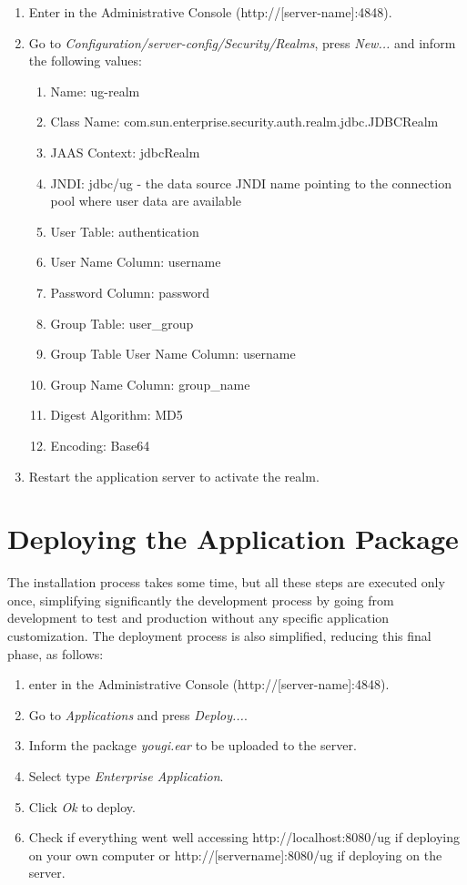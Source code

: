 \documentclass[envcountsame,envcountchap,letterpaper]{svmono}
\begin{document}
\begin{enumerate}
\item Enter in the Administrative Console (http://[server-name]:4848).
\item Go to \textit{Configuration/server-config/Security/Realms}, press \textit{New...} and inform the following values:
   \begin{enumerate}
   \item Name: ug-realm
   \item Class Name: com.sun.enterprise.security.auth.realm.jdbc.JDBCRealm
   \item JAAS Context: jdbcRealm
   \item JNDI: jdbc/ug - the data source JNDI name pointing to the connection pool where user data are available
   \item User Table: authentication
   \item User Name Column: username
   \item Password Column: password
   \item Group Table: user\_group
   \item Group Table User Name Column: username
   \item Group Name Column: group\_name
   \item Digest Algorithm: MD5
   \item Encoding: Base64
   \end{enumerate}
\item Restart the application server to activate the realm.
\end{enumerate}

\section{Deploying the Application Package}

The installation process takes some time, but all these steps are executed only once, simplifying significantly the development process by going from development to test and production without any specific application customization. The deployment process is also simplified, reducing this final phase, as follows:

\begin{enumerate}
\item enter in the Administrative Console (http://[server-name]:4848).
\item Go to \textit{Applications} and press \textit{Deploy...}.
\item Inform the package \textit{yougi.ear} to be uploaded to the server.
\item Select type \textit{Enterprise Application}.
\item Click \textit{Ok} to deploy.
\item Check if everything went well accessing http://localhost:8080/ug if deploying on your own computer or http://[servername]:8080/ug if deploying on the server.
\end{enumerate}
\end{document}

